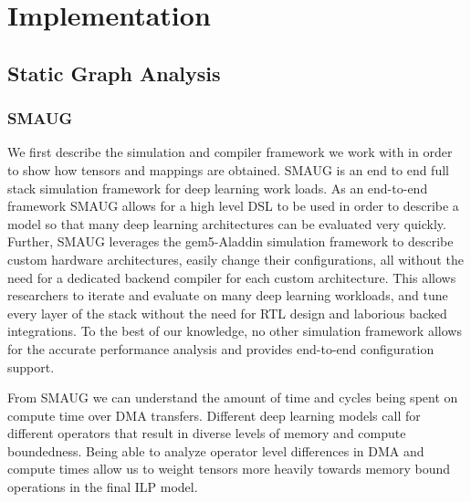 
\chapter{Implementation} %

\label{Chapter5} %
\section{Static Graph Analysis}
\subsection{SMAUG}

We first describe the simulation and compiler framework we work with in order
to show how tensors and mappings are obtained. SMAUG \cite{smaug} is an end to
end full stack simulation framework for deep learning work loads. As an
end-to-end framework SMAUG allows for a high level DSL to be used in order to
describe a model so that many deep learning architectures can be evaluated very
quickly. Further, SMAUG leverages the gem5-Aladdin \cite{aladdin} simulation
framework to describe custom hardware architectures, easily change their
configurations, all without the need for a dedicated backend compiler for each
custom architecture. This allows researchers to iterate and evaluate on many
deep learning workloads, and tune every layer of the stack without the need for
RTL design and laborious backed integrations. To the best of our knowledge, no
other simulation framework allows for the accurate performance analysis and
provides end-to-end configuration support.

From SMAUG we can understand the amount of time and cycles being spent on compute time
over DMA transfers. Different deep learning models call for different operators that
result in diverse levels of memory and compute boundedness. Being able to
analyze operator level differences in DMA and compute times allow us to weight tensors
more heavily towards memory bound operations in the final ILP model.

